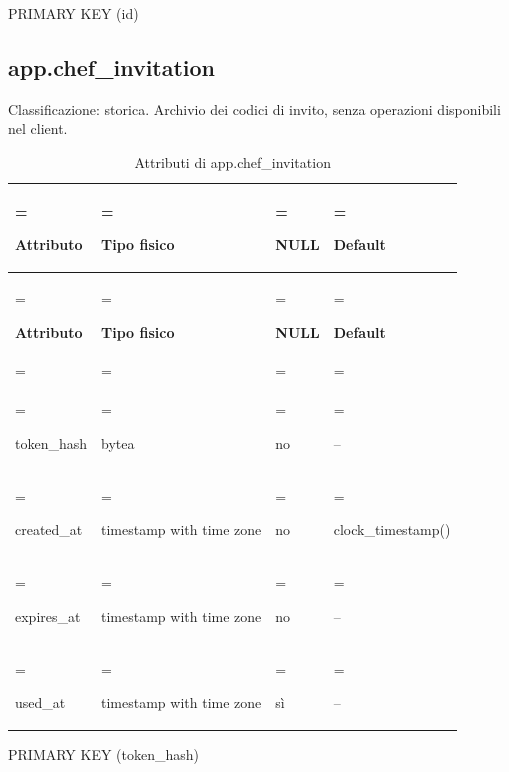 \documentclass[11pt,a4paper]{article}
\begin{document}
{\ttfamily\small PRIMARY KEY (\allowbreak{}id)}\par

\subsection{app.chef\_invitation}

Classificazione: storica. Archivio dei codici di invito, senza operazioni disponibili nel client.

{\small \renewcommand{\arraystretch}{1.2}

\begin{xltabular}{\linewidth}{>{\hsize\linewidth=\hsize\raggedright\arraybackslash}X>{\hsize\linewidth=\hsize\raggedright\arraybackslash}X>{\hsize\linewidth=\hsize\raggedright\arraybackslash}X>{\hsize\linewidth=\hsize\raggedright\arraybackslash}X}
\caption{Attributi di app.chef\_invitation}\label{tab:dictionary-9}\\
\toprule

\textbf{Attributo} & \textbf{Tipo fisico} & \textbf{NULL} & \textbf{Default}\\\midrule\endfirsthead\toprule\textbf{Attributo} & \textbf{Tipo fisico} & \textbf{NULL} & \textbf{Default}\\\midrule\endhead
\midrule{}\\\endfoot\bottomrule\endlastfoot


{\ttfamily\small token\_\allowbreak{}hash} & {\ttfamily\small bytea} & no & {\ttfamily\small --}\\\addlinespace[3pt]

{\ttfamily\small created\_\allowbreak{}at} & {\ttfamily\small timestamp with time zone} & no & {\ttfamily\small clock\_\allowbreak{}timestamp(\allowbreak{})}\\\addlinespace[3pt]

{\ttfamily\small expires\_\allowbreak{}at} & {\ttfamily\small timestamp with time zone} & no & {\ttfamily\small --}\\\addlinespace[3pt]

{\ttfamily\small used\_\allowbreak{}at} & {\ttfamily\small timestamp with time zone} & sì & {\ttfamily\small --}\\*

\end{xltabular}}

{\ttfamily\small PRIMARY KEY (\allowbreak{}token\_\allowbreak{}hash)}\par
\end{document}
